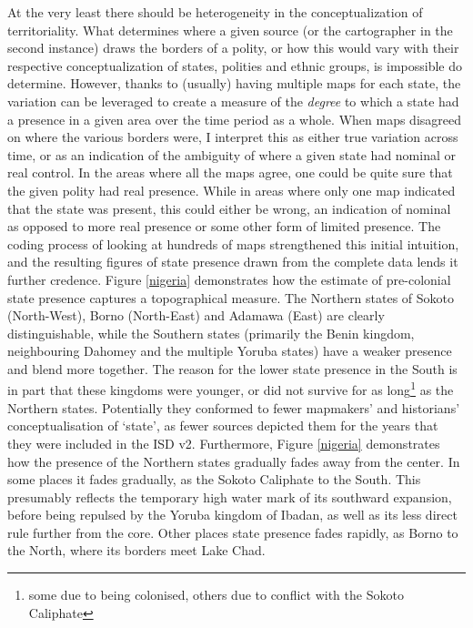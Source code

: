 \documentclass[12pt]{article}
\begin{document}
At the very least there should be heterogeneity in the conceptualization of
territoriality. What determines where a given source (or the cartographer in the
second instance) draws the borders of a polity, or how this would vary with
their respective conceptualization of states, polities and ethnic groups, is
impossible do determine. However, thanks to (usually) having multiple maps for
each state, the variation can be leveraged to create a measure of the
\textit{degree} to which a state had a presence in a given area over the time
period as a whole. When maps disagreed on where the various borders were, I
interpret this as either true variation across time, or as an indication of the
ambiguity of where a given state had nominal or real control. In the areas where
all the maps agree, one could be quite sure that the given polity had real
presence.  While in areas where only one map indicated that the state was
present, this could either be wrong, an indication of nominal as opposed to more
real presence or some other form of limited presence. The coding process of
looking at hundreds of maps strengthened this initial intuition, and the
resulting figures of state presence drawn from the complete data lends it
further credence. Figure \ref{nigeria} demonstrates how the estimate of
pre-colonial state presence captures a topographical measure. The Northern
states of Sokoto (North-West), Borno (North-East) and Adamawa (East) are clearly
distinguishable, while the Southern states (primarily the Benin kingdom,
neighbouring Dahomey and the multiple Yoruba states) have a weaker presence and
blend more together. The reason for the lower state presence in the South is in
part that these kingdoms were younger, or did not survive for as
long\footnote{some due to being colonised, others due to conflict with the
Sokoto Caliphate} as the Northern states. Potentially they conformed to fewer
mapmakers' and historians' conceptualisation of `state', as fewer sources
depicted them for the years that they were included in the ISD v2. Furthermore,
Figure \ref{nigeria} demonstrates how the presence of the Northern states
gradually fades away from the center. In some places it fades gradually, as the
Sokoto Caliphate to the South. This presumably reflects the temporary high water
mark of its southward expansion, before being repulsed by the Yoruba kingdom of
Ibadan, as well as its less direct rule further from the core. Other places
state presence fades rapidly, as Borno to the North, where its borders meet Lake
Chad.

\end{document}
